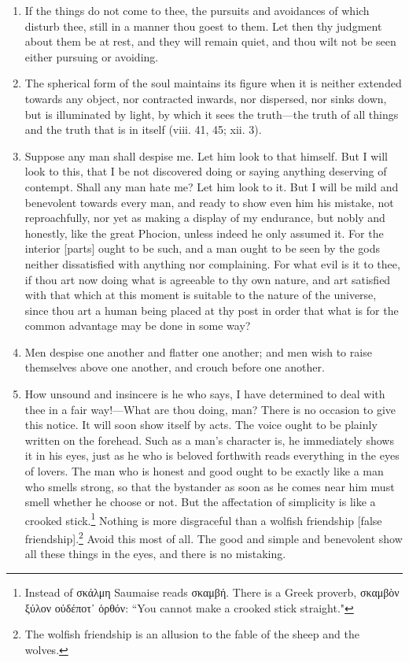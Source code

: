 \begin{enumerate}
\item If the things do not come to thee, the pursuits and avoidances of which disturb thee, still in a manner thou goest to them. Let then thy judgment about them be at rest, and they will remain quiet, and thou wilt not be seen either pursuing or avoiding.

\item The spherical form of the soul maintains its figure when it is neither extended towards any object, nor contracted inwards, nor dispersed, nor sinks down, but is illuminated by light, by which it sees the truth—the truth of all things and the truth that is in itself (viii. 41, 45; xii. 3).

\item Suppose any man shall despise me. Let him look to that himself. But I will look to this, that I be not discovered doing or saying anything deserving of contempt. Shall any man hate me? Let him look to it. But I will be mild and benevolent towards every man, and ready to show even him his mistake, not reproachfully, nor yet as making a display of my endurance, but nobly and honestly, like the great Phocion, unless indeed he only assumed it. For the interior [{\clarify parts}] ought to be such, and a man ought to be seen by the gods neither dissatisfied with anything nor complaining. For what evil is it to thee, if thou art now doing what is agreeable to thy own nature, and art satisfied with that which at this moment is suitable to the nature of the universe, since thou art a human being placed at thy post in order that what is for the common advantage may be done in some way?

\item Men despise one another and flatter one another; and men wish to raise themselves above one another, and crouch before one another.

\item How unsound and insincere is he who says, I have determined to deal with thee in a fair way!—What are thou doing, man? There is no occasion to give this notice. It will soon show itself by acts. The voice ought to be plainly written on the forehead. Such as a man's character is, he immediately shows it in his eyes, just as he who is beloved forthwith reads everything in the eyes of lovers. The man who is honest and good ought to be exactly like a man who smells strong, so that the bystander as soon as he comes near him must smell whether he choose or not. But the affectation of simplicity is like a crooked stick.\footnote{Instead of \textgreek{σκάλμη} Saumaise reads \textgreek{σκαμβή}. There is a Greek proverb, \textgreek{σκαμβὸν ξύλον οὐδέποτ᾽ ὀρθόν}: ``You cannot make a crooked stick straight."} Nothing is more disgraceful than a wolfish friendship [{\clarify false friendship}].\footnote{The wolfish friendship is an allusion to the fable of the sheep and the wolves.} Avoid this most of all. The good and simple and benevolent show all these things in the eyes, and there is no mistaking.


\end{enumerate}
